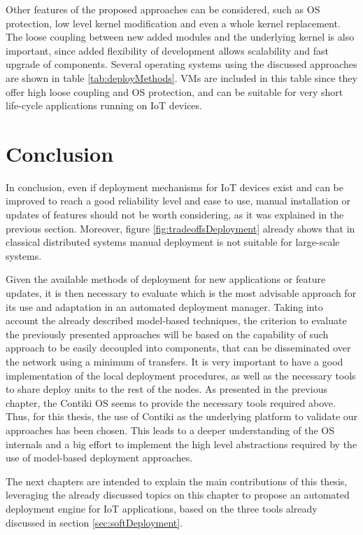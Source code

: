 Other features of the proposed approaches can be considered, such as OS protection, low level kernel modification and even a whole kernel replacement.
The loose coupling between new added modules and the underlying kernel is also important, since added flexibility of development allows scalability and fast upgrade of components.
Several operating systems using the discussed approaches are shown in table \ref{tab:deployMethods}.
VMs are included in this table since they offer high loose coupling and OS protection, and can be suitable for very short life-cycle applications running on IoT devices.



\section{Conclusion}
In conclusion, even if deployment mechanisms for IoT devices exist and can be improved to reach a good reliability level and ease to use, manual installation or updates of features should not be worth considering, as it was explained in the previous section.
Moreover, figure \ref{fig:tradeoffsDeployment} already shows that in classical distributed systems manual deployment is not suitable for large-scale systems.

Given the available methods of deployment for new applications or feature updates, it is then necessary to evaluate which is the most advisable approach for its use and adaptation in an automated deployment manager.
Taking into account the already described model-based techniques, the criterion to evaluate the previously presented approaches will be based on the capability of such approach to be easily decoupled into components, that can be disseminated over the network using a minimum of transfers.
It is very important to have a good implementation of the local deployment procedures, as well as the necessary tools to share deploy units to the rest of the nodes.
As presented in the previous chapter, the Contiki OS seems to provide the necessary tools required above.
Thus, for this thesis, the use of Contiki as the underlying platform to validate our approaches has been chosen.
This leads to a deeper understanding of the OS internals and a big effort to implement the high level abstractions required by the use of model-based deployment approaches.

The next chapters are intended to explain the main contributions of this thesis, leveraging the already discussed topics on this chapter to propose an automated deployment engine for IoT applications, based on the three tools already discussed in section \ref{sec:softDeployment}.